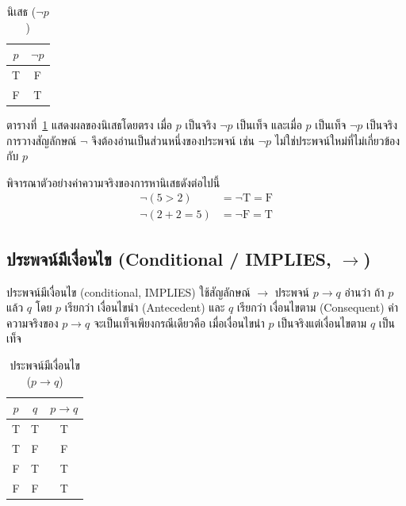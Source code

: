 \begin{table}[H]
    \centering
    \caption{นิเสธ ($\neg p$)}
    \label{tab:not-truth}
    \begin{tabular}{|c|c|}
        \hline
        \textbf{$p$} & \textbf{$\neg p$} \\ \hline
        T & F \\ \hline
        F & T \\ \hline
    \end{tabular}
\end{table}

ตารางที่~\ref{tab:not-truth} แสดงผลของนิเสธโดยตรง เมื่อ $p$ เป็นจริง $\neg p$ เป็นเท็จ และเมื่อ $p$ เป็นเท็จ $\neg p$ เป็นจริง การวางสัญลักษณ์ $\neg$ จึงต้องอ่านเป็นส่วนหนึ่งของประพจน์ เช่น $\neg p$ ไม่ใช่ประพจน์ใหม่ที่ไม่เกี่ยวข้องกับ $p$

\noindent พิจารณาตัวอย่างค่าความจริงของการหานิเสธดังต่อไปนี้
\begin{align*}
\neg (5 > 2) &= \neg \text{T} = \text{F}\\
\neg (2 + 2 = 5) &= \neg \text{F} = \text{T}
\end{align*}

\subsection{ประพจน์มีเงื่อนไข (Conditional / IMPLIES, $\rightarrow$)}

ประพจน์มีเงื่อนไข (conditional, IMPLIES) ใช้สัญลักษณ์ $\rightarrow$ ประพจน์ $p \rightarrow q$ อ่านว่า ถ้า $p$ แล้ว $q$ โดย $p$ เรียกว่า เงื่อนไขนำ (Antecedent) และ $q$ เรียกว่า เงื่อนไขตาม (Consequent) ค่าความจริงของ $p \rightarrow q$ จะเป็นเท็จเพียงกรณีเดียวคือ เมื่อเงื่อนไขนำ $p$ เป็นจริงแต่เงื่อนไขตาม $q$ เป็นเท็จ~\parencite{epp2019discrete}

\begin{table}[H]
    \centering
    \caption{ประพจน์มีเงื่อนไข ($p \rightarrow q$)}
    \label{tab:implies-truth}
    \begin{tabular}{|c|c|c|}
        \hline
        \textbf{$p$} & \textbf{$q$} & \textbf{$p \rightarrow q$} \\ \hline
        T & T & T \\ \hline
        T & F & F \\ \hline
        F & T & T \\ \hline
        F & F & T \\ \hline
    \end{tabular}
\end{table}

